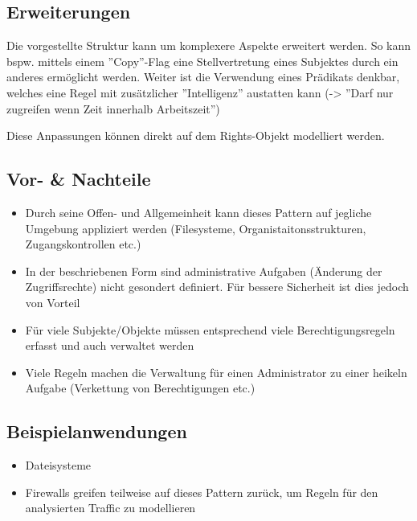 \subsection*{Erweiterungen}
Die vorgestellte Struktur kann um komplexere Aspekte erweitert werden. So kann bspw. mittels einem ''Copy''-Flag eine Stellvertretung eines Subjektes durch ein anderes ermöglicht werden.
Weiter ist die Verwendung eines Prädikats denkbar, welches eine Regel mit zusätzlicher ''Intelligenz'' austatten kann (-> ''Darf nur zugreifen wenn Zeit innerhalb Arbeitszeit'')

Diese Anpassungen können direkt auf dem Rights-Objekt modelliert werden.

\subsection*{Vor- \& Nachteile}
\begin{itemize}
	\item Durch seine Offen- und Allgemeinheit kann dieses Pattern auf jegliche Umgebung appliziert werden (Filesysteme, Organistaitonsstrukturen, Zugangskontrollen etc.)
	\item In der beschriebenen Form sind administrative Aufgaben (Änderung der Zugriffsrechte) nicht gesondert definiert. Für bessere Sicherheit ist dies jedoch von Vorteil
	\item Für viele Subjekte/Objekte müssen entsprechend viele Berechtigungsregeln erfasst und auch verwaltet werden
	\item Viele Regeln machen die Verwaltung für einen Administrator zu einer heikeln Aufgabe (Verkettung von Berechtigungen etc.)
\end{itemize}

\subsection*{Beispielanwendungen}
\begin{itemize}
	\item Dateisysteme
	\item Firewalls greifen teilweise auf dieses Pattern zurück, um Regeln für den analysierten Traffic zu modellieren
\end{itemize}